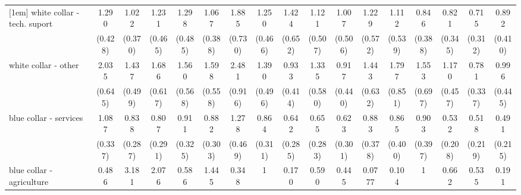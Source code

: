 {\begin{tabular}{l*{16}{c}}
[1em]
white collar - tech. suport&       1.290         &       1.022         &       1.231         &       1.298         &       1.067         &       1.885         &       1.250         &       1.424         &       1.121         &       1.007         &       1.229         &       1.112         &       0.846         &       0.821         &       0.715         &       0.892         \\
                    &     (0.428)         &     (0.370)         &     (0.465)         &     (0.485)         &     (0.388)         &     (0.730)         &     (0.466)         &     (0.652)         &     (0.507)         &     (0.506)         &     (0.572)         &     (0.539)         &     (0.388)         &     (0.345)         &     (0.312)         &     (0.410)         \\
[1em]
white collar - other&       2.035\sym{*}  &       1.437         &       1.686         &       1.560         &       1.598         &       2.481\sym{*}  &       1.390         &       0.933         &       1.335         &       0.917         &       1.443         &       1.797         &       1.553         &       1.170         &       0.781         &       0.996         \\
                    &     (0.645)         &     (0.499)         &     (0.617)         &     (0.568)         &     (0.558)         &     (0.916)         &     (0.496)         &     (0.414)         &     (0.580)         &     (0.440)         &     (0.632)         &     (0.851)         &     (0.697)         &     (0.457)         &     (0.337)         &     (0.445)         \\
[1em]
blue collar - services&       1.087         &       0.838         &       0.807         &       0.911         &       0.882         &       1.278         &       0.864         &       0.642         &       0.655         &       0.623         &       0.883         &       0.865         &       0.903         &       0.532         &       0.518         &       0.491         \\
                    &     (0.337)         &     (0.287)         &     (0.291)         &     (0.325)         &     (0.303)         &     (0.469)         &     (0.311)         &     (0.285)         &     (0.283)         &     (0.301)         &     (0.378)         &     (0.400)         &     (0.397)         &     (0.208)         &     (0.219)         &     (0.215)         \\
[1em]
blue collar - agriculture&       0.486         &       3.181         &       2.076         &       0.586         &       1.445         &       0.348         &           1         &       0.170         &       0.590         &       0.445         &      0.0777\sym{*}  &       0.104         &           1         &       0.662         &       0.535         &       0.191         \\

\end{tabular}}
